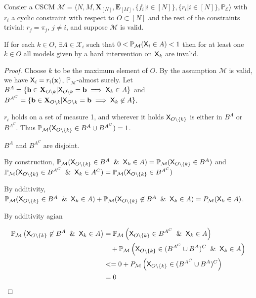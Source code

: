 \begin{theorem}\label{th:recursive_no_interventions}
Consier a CSCM $\mathcal{M}=\langle N,M,\mathbf{X}_{[N]},\mathbf{E}_{[M]},\{f_i|i\in[N]\},\{r_i|i\in [N]\},\mathbb{P}_{\mathcal{E}}\rangle$ with $r_i$ a cyclic constraint with respect to $O\subset[N]$ and the rest of the constraints trivial: $r_j = \pi_j$, $j\neq i$, and suppose $\mathcal{M}$ is valid.

If for each $k\in O$, $\exists A\in \mathcal{X}_i$ such that $0<\mathbb{P}_{\mathcal{M}}(\mathsf{X}_i\in A)<1$ then for at least one $k\in O$ all models given by a hard intervention on $\mathsf{X}_k$ are invalid.
\end{theorem}

\begin{proof}
Choose $k$ to be the maximum element of $O$. By the assumption $\mathcal{M}$ is valid, we have $\mathsf{X}_i=r_i(\mathbf{x})$, $\mathbb{P}_{\mathcal{M}}$-almost surely. Let $B^A=\{\mathbf{b}\in \mathbf{X}_{O\setminus k}|\mathsf{X}_{O\setminus k}=\mathbf{b}\implies \mathsf{X}_k \in A\}$ and $B^{A^C}=\{\mathbf{b}\in \mathbf{X}_{O\setminus k}|\mathsf{X}_{O\setminus k}=\mathbf{b}\implies \mathsf{X}_k \not\in A\}$. 

$r_i$ holds on a set of measure 1, and wherever it holds $\mathsf{X}_{O\setminus\{k\}}$ is either in $B^A$ or $B^{A^C}$. Thus $\mathbb{P}_{\mathcal{M}}(\mathsf{X}_{O\setminus\{k\}}\in B^A\cup B^{A^C})=1$. 

$B^A$ and $B^{A^C}$ are disjoint.

By construction, $\mathbb{P}_{\mathcal{M}}(\RV{X}_{O\setminus\{k\}}\in B^A \And \RV{X}_k\in A) = \mathbb{P}_{\mathcal{M}}(\RV{X}_{O\setminus\{k\}}\in B^A)$ and $\mathbb{P}_{\mathcal{M}}(\RV{X}_{O\setminus\{k\}}\in B^{A^C} \And \RV{X}_k\in A^C) = \mathbb{P}_{\mathcal{M}}(\RV{X}_{O\setminus\{k\}}\in B^{A^C})$

By additivity, $\mathbb{P}_{\mathcal{M}}(\RV{X}_{O\setminus\{k\}}\in B^A \And \RV{X}_k\in A) + \mathbb{P}_{\mathcal{M}} (\RV{X}_{O\setminus\{k\}}\not\in B^A \And \RV{X}_k\in A)=P_{\mathcal{M}} (\RV{X}_k\in A)$. 

By additivity agian

\begin{align}
	\mathbb{P}_{\mathcal{M}} \left(\RV{X}_{O\setminus\{k\}}\not\in B^A \And \RV{X}_k\in A\right) &=\mathbb{P}_{\mathcal{M}} \left(\RV{X}_{O\setminus\{k\}}\in B^{A^C} \And \RV{X}_k\in A\right) \\
	&\quad+  \mathbb{P}_{\mathcal{M}} \left(\RV{X}_{O\setminus\{k\}}\in (B^{A^C}\cup B^A)^C \And \RV{X}_k\in A\right)\\
	&<= 0 + P_{\mathcal{M}} \left(\RV{X}_{O\setminus\{k\}}\in (B^{A^C}\cup B^A)^C\right)\\
	&= 0
\end{align}


\end{proof}
